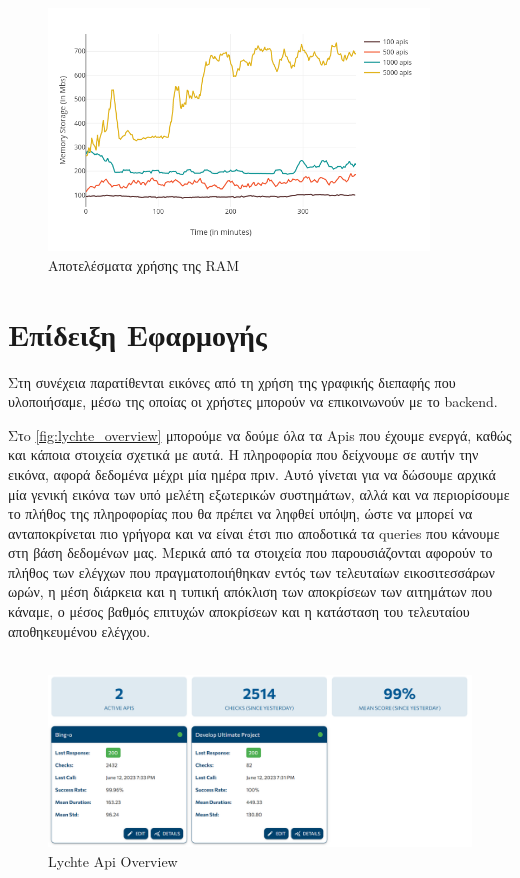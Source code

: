 \begin{figure}[H]
	\centering
	\includegraphics[width=0.9\textwidth]{./images/chapter5/memory-plot.png}
	\caption[Αποτελέσματα χρήσης της RAM]{Αποτελέσματα χρήσης της RAM}
	\label{fig:ram_usage}
\end{figure}

\clearpage

\section{Επίδειξη Εφαρμογής}
\label{section:webapp_showcase}

Στη συνέχεια παρατίθενται εικόνες από τη χρήση της γραφικής διεπαφής που υλοποιήσαμε, μέσω της οποίας
οι χρήστες μπορούν να επικοινωνούν με το backend.

Στo \autoref{fig:lychte_overview} μπορούμε να δούμε όλα τα Apis που έχουμε ενεργά, καθώς και κάποια στοιχεία σχετικά με αυτά.
Η πληροφορία που δείχνουμε σε αυτήν την εικόνα, αφορά δεδομένα μέχρι μία ημέρα πριν. Αυτό γίνεται για να δώσουμε αρχικά μία γενική εικόνα
των υπό μελέτη εξωτερικών συστημάτων, αλλά και να περιορίσουμε το πλήθος της πληροφορίας που θα πρέπει να ληφθεί υπόψη,
ώστε να μπορεί να ανταποκρίνεται πιο γρήγορα και να είναι έτσι πιο αποδοτικά τα queries που κάνουμε στη βάση δεδομένων μας. Μερικά από
τα στοιχεία που παρουσιάζονται αφορούν το πλήθος των ελέγχων που πραγματοποιήθηκαν εντός των τελευταίων εικοσιτεσσάρων ωρών, η μέση διάρκεια και η τυπική
απόκλιση των αποκρίσεων των αιτημάτων που κάναμε, ο μέσος βαθμός επιτυχών αποκρίσεων και η κατάσταση του τελευταίου αποθηκευμένου ελέγχου. \\
\\

\begin{figure}[!ht]
	\centering
	\includegraphics[width=1\textwidth]{./images/chapter5/overview_landing.png}
	\caption[Lychte Api Overview]{Lychte Api Overview}
	\label{fig:lychte_overview}
\end{figure}

